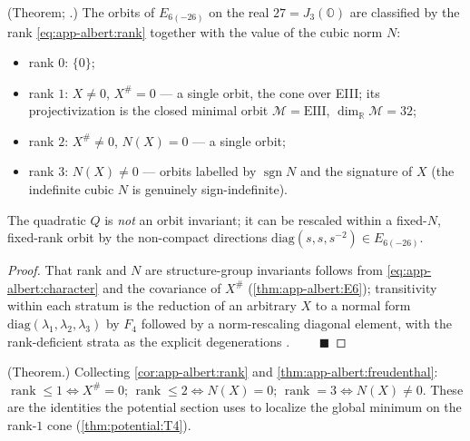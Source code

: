 \begin{theorem}\label{thm:app-albert:orbits}
\textup{(Theorem; \cite{Springer:2000,Krutelevich:2007}.)}
The orbits of $E_{6(-26)}$ on the real $27=J_3(\mathbb O)$ are classified by the
rank \eqref{eq:app-albert:rank} together with the value of the cubic norm $N$:
\begin{itemize}
  \item rank $0$: $\{0\}$;
  \item rank $1$: $X\neq0$, $X^\#=0$ --- a single orbit, the cone over EIII; its
    projectivization is the closed minimal orbit $\mathcal M=\mathrm{EIII}$,
    $\dim_{\mathbb R}\mathcal M=32$;
  \item rank $2$: $X^\#\neq0$, $N(X)=0$ --- a single orbit;
  \item rank $3$: $N(X)\neq0$ --- orbits labelled by $\operatorname{sgn}N$ and the
    signature of $X$ (the indefinite cubic $N$ is genuinely sign-indefinite).
\end{itemize}
The quadratic $Q$ is \emph{not} an orbit invariant; it can be rescaled within a
fixed-$N$, fixed-rank orbit by the non-compact directions
$\mathrm{diag}(s,s,s^{-2})\in E_{6(-26)}$.
\end{theorem}

\begin{proof}
That rank and $N$ are structure-group invariants follows from
\eqref{eq:app-albert:character} and the covariance of $X^\#$
(\autoref{thm:app-albert:E6}); transitivity within each stratum is the
reduction of an arbitrary $X$ to a normal form
$\mathrm{diag}(\lambda_1,\lambda_2,\lambda_3)$ by $F_4$ followed by a
norm-rescaling diagonal element, with the rank-deficient strata as the explicit
degenerations \cite{Krutelevich:2007,Springer:2000}. $\qquad\blacksquare$
\end{proof}

\begin{remark}\label{rmk:app-albert:sharpsummary}
\textup{(Theorem.)}
Collecting \autoref{cor:app-albert:rank} and
\autoref{thm:app-albert:freudenthal}: $\operatorname{rank}\le1\Leftrightarrow
X^\#=0$; $\operatorname{rank}\le2\Leftrightarrow N(X)=0$;
$\operatorname{rank}=3\Leftrightarrow N(X)\neq0$. These are the identities the
potential section uses to localize the global minimum on the rank-$1$ cone
(\autoref{thm:potential:T4}).
\end{remark}

